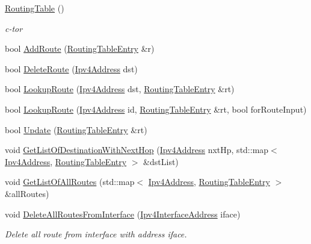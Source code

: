 \begin{DoxyCompactItemize}
\item 
\hyperlink{classns3_1_1dsdv_1_1RoutingTable_afa79408eee3752cd28db3490e2ce7b56}{Routing\+Table} ()
\begin{DoxyCompactList}\small\item\em c-\/tor \end{DoxyCompactList}\item 
bool \hyperlink{classns3_1_1dsdv_1_1RoutingTable_a4eed9bac83e90f1db01e414892e10b9b}{Add\+Route} (\hyperlink{classns3_1_1dsdv_1_1RoutingTableEntry}{Routing\+Table\+Entry} \&r)
\item 
bool \hyperlink{classns3_1_1dsdv_1_1RoutingTable_a384f271a1393c513c4ae7ba4476c3e08}{Delete\+Route} (\hyperlink{classns3_1_1Ipv4Address}{Ipv4\+Address} dst)
\item 
bool \hyperlink{classns3_1_1dsdv_1_1RoutingTable_a0bfb9dc677f02bd740973865e38df763}{Lookup\+Route} (\hyperlink{classns3_1_1Ipv4Address}{Ipv4\+Address} dst, \hyperlink{classns3_1_1dsdv_1_1RoutingTableEntry}{Routing\+Table\+Entry} \&rt)
\item 
bool \hyperlink{classns3_1_1dsdv_1_1RoutingTable_a34bc388ee41d6b5602b1bb4bdd6e1670}{Lookup\+Route} (\hyperlink{classns3_1_1Ipv4Address}{Ipv4\+Address} id, \hyperlink{classns3_1_1dsdv_1_1RoutingTableEntry}{Routing\+Table\+Entry} \&rt, bool for\+Route\+Input)
\item 
bool \hyperlink{classns3_1_1dsdv_1_1RoutingTable_a651762730975f809c720313b1332cb99}{Update} (\hyperlink{classns3_1_1dsdv_1_1RoutingTableEntry}{Routing\+Table\+Entry} \&rt)
\item 
void \hyperlink{classns3_1_1dsdv_1_1RoutingTable_a7efb980be4e4f556b73905038483c154}{Get\+List\+Of\+Destination\+With\+Next\+Hop} (\hyperlink{classns3_1_1Ipv4Address}{Ipv4\+Address} nxt\+Hp, std\+::map$<$ \hyperlink{classns3_1_1Ipv4Address}{Ipv4\+Address}, \hyperlink{classns3_1_1dsdv_1_1RoutingTableEntry}{Routing\+Table\+Entry} $>$ \&dst\+List)
\item 
void \hyperlink{classns3_1_1dsdv_1_1RoutingTable_af980697df819d8a00ee8782c705e3dac}{Get\+List\+Of\+All\+Routes} (std\+::map$<$ \hyperlink{classns3_1_1Ipv4Address}{Ipv4\+Address}, \hyperlink{classns3_1_1dsdv_1_1RoutingTableEntry}{Routing\+Table\+Entry} $>$ \&all\+Routes)
\item 
void \hyperlink{classns3_1_1dsdv_1_1RoutingTable_a910728601836ce9beb169b6a4e489cf1}{Delete\+All\+Routes\+From\+Interface} (\hyperlink{classns3_1_1Ipv4InterfaceAddress}{Ipv4\+Interface\+Address} iface)
\begin{DoxyCompactList}\small\item\em Delete all route from interface with address iface. \end{DoxyCompactList}\item 

\end{DoxyCompactItemize}
